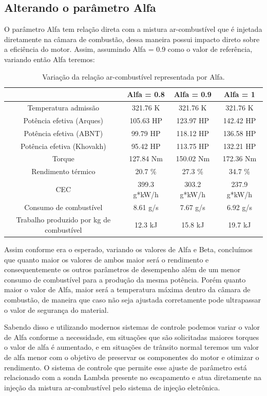 \documentclass[a4paper]{article}
\begin{document}
\subsection{Alterando o parâmetro Alfa}
O parâmetro Alfa tem relação direta com a mistura ar-combustível que é injetada diretamente na câmara de combustão, dessa maneira possui impacto direto sobre a eficiência do motor. Assim, assumindo Alfa = 0.9 como o valor de referência, variando então Alfa teremos:

\begin{table}[!htb]
    \centering
    \begin{tabular}{|c|c|c|c|}
    \hline
    & Alfa = 0.8 & Alfa = 0.9 & Alfa = 1\\
    \hline
    Temperatura admissão & 321.76 K & 321.76 K & 321.76 K \\
    \hline
    Potência efetiva (Arques) & 105.63 HP & 123.97 HP & 142.42 HP \\
    \hline
    Potência efetiva (ABNT) & 99.79 HP & 118.12 HP & 136.58 HP \\
    \hline
    Potência efetiva (Khovakh) & 95.42 HP & 113.75 HP & 132.21 HP \\
    \hline
    Torque & 127.84 Nm & 150.02 Nm & 172.36 Nm \\
    \hline
    Rendimento térmico & 20.7 \% & 27.3 \% & 34.7 \% \\
    \hline
    CEC & 399.3 g*kW/h & 303.2 g*kW/h & 237.9 g*kW/h \\
    \hline
    Consumo de combustível & 8.61 g/s & 7.67 g/s & 6.92 g/s \\
    \hline
    Trabalho produzido por kg de combustível & 12.3 kJ  & 15.8 kJ & 19.7 kJ\\
    \hline
    \end{tabular}
    \caption{Variação da relação ar-combustível representada por Alfa.}
\end{table}
Assim conforme era o esperado, variando os valores de Alfa e Beta, concluímos que quanto maior os valores de ambos maior será o rendimento e consequentemente os outros parâmetros de desempenho além de um menor consumo de combustível para a produção da mesma potência. Porém quanto maior o valor de Alfa, maior será a temperatura máxima dentro da câmara de combustão, de maneira que caso não seja ajustada corretamente pode ultrapassar o valor de segurança do material.

Sabendo disso e utilizando modernos sistemas de controle podemos variar o valor de Alfa conforme a necessidade, em situações que são solicitadas maiores torques o valor de alfa é aumentado, e em situações de trânsito normal teremos um valor de alfa menor com o objetivo de preservar os componentes do motor e otimizar o rendimento. O sistema de controle que permite esse ajuste de parâmetro está relacionado com a sonda Lambda presente no escapamento e atua diretamente na injeção da mistura ar-combustível pelo sistema de injeção eletrônica.
\end{document}

